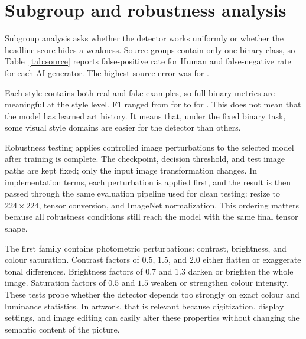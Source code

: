 \documentclass[11pt,a4paper]{article}
\begin{document}
\section{Subgroup and robustness analysis}

Subgroup analysis asks whether the detector works uniformly or whether the
headline score hides a weakness. Source groups contain only one binary class,
so Table~\ref{tab:source} reports false-positive rate for Human and
false-negative rate for each AI generator. The highest source error was
\HighestSourceError{} for \HighestErrorSource.

\begin{table}[ht]
\centering

\caption{Class-appropriate test error by image source.}
\label{tab:source}
\end{table}

Each style contains both real and fake examples, so full binary metrics are
meaningful at the style level. F1 ranged from \LowestStyleFOne{} for
\LowestStyle{} to \HighestStyleFOne{} for \HighestStyle. This does not mean
that the model has learned art history. It means that, under the fixed binary
task, some visual style domains are easier for the detector than others.

\begin{table}[ht]
\centering
\resizebox{\textwidth}{!}{}
\caption{Held-out test metrics by artistic style.}
\label{tab:style}
\end{table}

Robustness testing applies controlled image perturbations to the selected
model after training is complete. The checkpoint, decision threshold, and test
image paths are kept fixed; only the input image transformation changes. In
implementation terms, each perturbation is applied first, and the result is
then passed through the same evaluation pipeline used for clean testing:
resize to \(224\times224\), tensor conversion, and ImageNet normalization.
This ordering matters because all robustness conditions still reach the model
with the same final tensor shape.

The first family contains photometric perturbations: contrast, brightness, and
colour saturation. Contrast factors of \(0.5\), \(1.5\), and \(2.0\) either
flatten or exaggerate tonal differences. Brightness factors of \(0.7\) and
\(1.3\) darken or brighten the whole image. Saturation factors of \(0.5\) and
\(1.5\) weaken or strengthen colour intensity. These tests probe whether the
detector depends too strongly on exact colour and luminance statistics. In
artwork, that is relevant because digitization, display settings, and image
editing can easily alter these properties without changing the semantic
content of the picture.
\end{document}

